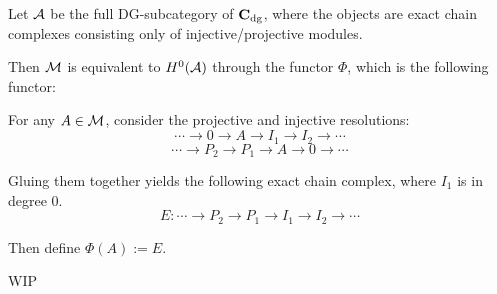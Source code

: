 Let \( {\mathcal{A}} \) be the full DG-subcategory of \( \operatorname{\mathbf{C}}_{\operatorname{dg}} \), where the objects are exact chain complexes consisting only of injective/projective modules.

Then \( {\mathcal{M}} \) is equivalent to \( H^0({\mathcal{A}}) \) through the functor \( \Phi \), which is the following functor:

For any \( A \in {\mathcal{M}} \), consider the projective and injective resolutions:
\[
    \cdots \to 0 \to A \to I_1 \to I_2 \to \cdots
\]
\[
    \cdots \to P_2 \to P_1 \to A \to 0 \to \cdots
\]

Gluing them together yields the following exact chain complex, where \( I_1 \) is in degree \( 0 \).
\[
    E: \cdots \to P_2 \to P_1 \to I_1 \to I_2 \to \cdots
\]

Then define \( \Phi(A) := E \).

WIP







